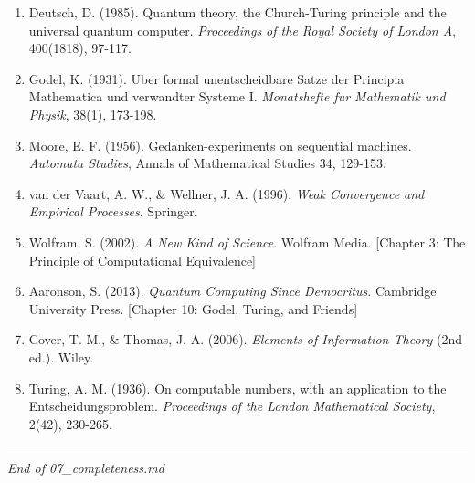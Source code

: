\documentclass[
  12pt,
]{ctexart}
\providecommand{\tightlist}{%
  \setlength{\itemsep}{0pt}\setlength{\parskip}{0pt}}
\begin{document}
\begin{enumerate}
\def\labelenumi{\arabic{enumi}.}
\tightlist
\item
  Deutsch, D. (1985). Quantum theory, the Church-Turing principle and
  the universal quantum computer. \emph{Proceedings of the Royal Society
  of London A}, 400(1818), 97-117.
\item
  Godel, K. (1931). Uber formal unentscheidbare Satze der Principia
  Mathematica und verwandter Systeme I. \emph{Monatshefte fur Mathematik
  und Physik}, 38(1), 173-198.
\item
  Moore, E. F. (1956). Gedanken-experiments on sequential machines.
  \emph{Automata Studies}, Annals of Mathematical Studies 34, 129-153.
\item
  van der Vaart, A. W., \& Wellner, J. A. (1996). \emph{Weak Convergence
  and Empirical Processes}. Springer.
\item
  Wolfram, S. (2002). \emph{A New Kind of Science}. Wolfram Media.
  {[}Chapter 3: The Principle of Computational Equivalence{]}
\item
  Aaronson, S. (2013). \emph{Quantum Computing Since Democritus}.
  Cambridge University Press. {[}Chapter 10: Godel, Turing, and
  Friends{]}
\item
  Cover, T. M., \& Thomas, J. A. (2006). \emph{Elements of Information
  Theory} (2nd ed.). Wiley.
\item
  Turing, A. M. (1936). On computable numbers, with an application to
  the Entscheidungsproblem. \emph{Proceedings of the London Mathematical
  Society}, 2(42), 230-265.
\end{enumerate}

\begin{center}\rule{0.5\linewidth}{0.5pt}\end{center}

\emph{End of 07\_completeness.md}
\end{document}
